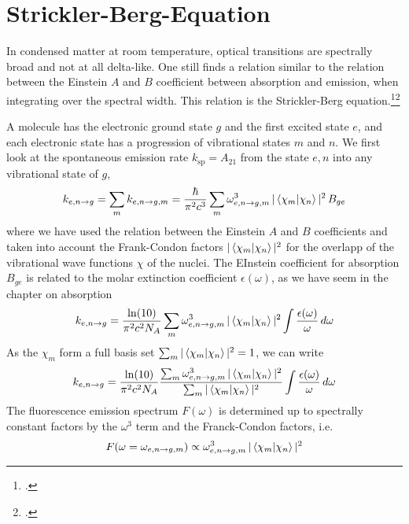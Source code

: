 \section{Strickler-Berg-Equation} 


In condensed matter at room temperature, optical transitions are spectrally broad and not at all delta-like. One still finds a relation similar to the relation between the Einstein $A$ and $B$ coefficient between absorption and emission, when integrating over the spectral width. This relation is the  Strickler-Berg equation.\footcite[chapter 5.3][]{Strickler_Berg, Parson}\footcite[chapter 
1.4.3.2]{KoehlerBaessler2015}


A molecule has the electronic ground state $g$ and the first excited state $e$, and each electronic state has a progression of vibrational states $m$ and $n$. We first look at the spontaneous emission rate  $k_{\text{sp}} =  A_{21}$
from the state $e,n$ into any vibrational state of $g$, 
%
\begin{equation}
k_{e,n \rightarrow g}  = \sum_m  k_{e,n \rightarrow g,m}  = \frac{\hbar}{\pi^2 c^3} \sum_m  \omega_{e,n \rightarrow g,m}^3 \,  | \braket{\chi_m |  \chi_n} |^2 \, B_{ge} 
\end{equation}
where we have used the relation between the Einstein $A$ and $B$ coefficients and taken into account the Frank-Condon factors $ | \braket {\chi_m | \chi_n} |^2 $ for the overlapp of the vibrational wave functions $\chi$ of the nuclei.
%
The EInstein coefficient for absorption $B_{ge} $ is related to the molar extinction coefficient $\epsilon(\omega)$, as we have seem in the chapter on absorption
\begin{equation}
 k_{e,n \rightarrow g}  = \frac{\ln(10)}{\pi^2 c^2 N_A} \sum_m  \omega_{e,n \rightarrow g,m}^3 \,  | \braket{\chi_m |  \chi_n} |^2
 \int \frac{\epsilon(\omega)}{\omega} \, d \omega
\end{equation}
%
As the  $\chi_m$ form a full basis set $\sum_m  | \braket {\chi_m | \chi_n} |^2 = 1$,  we can write
\begin{equation}
 k_{e,n \rightarrow g}  = \frac{\ln(10)}{\pi^2 c^2 N_A} 
%
\frac{ 
 \sum_m  \omega_{e,n \rightarrow g,m}^3 \,  | \braket{\chi_m |  \chi_n} |^2 }
 { \sum_m  | \braket {\chi_m | \chi_n} |^2 }
 \int \frac{\epsilon(\omega)}{\omega} \, d \omega
\end{equation}
The fluorescence emission spectrum $F(\omega)$ is determined up to spectrally constant factors by the $\omega^3$ term and the Franck-Condon factors, i.e.
\begin{equation}
 F(\omega =  \omega_{e,n \rightarrow g,m} )  \propto  \omega_{e,n \rightarrow g,m}^3 \,  | \braket{\chi_m |  \chi_n} |^2 
\end{equation}
